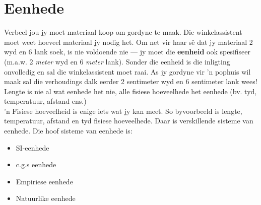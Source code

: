 \section{Eenhede}
Verbeel jou jy moet materiaal koop om gordyne te maak. Die winkelassistent moet weet hoeveel materiaal jy nodig het. Om net vir haar sê dat jy materiaal 2 wyd en 6 lank soek, is nie voldoende nie --- jy moet die \textbf{eenheid} ook spesifiseer (m.a.w. 2 \textsl{meter} wyd en 6 \textsl{meter} lank). Sonder die eenheid is die inligting onvolledig en sal die winkelassistent moet raai. As jy gordyne vir  'n pophuis wil maak sal die verhoudings dalk eerder 2 sentimeter wyd en 6 sentimeter lank wees!\\ 
Lengte is nie al wat eenhede het nie, alle fisiese hoeveelhede het eenhede (bv. tyd, temperatuur, afstand ens.)\\
 { 'n Fisiese hoeveelheid is enige iets wat jy kan meet. So byvoorbeeld is lengte, temperatuur, afstand en tyd fisiese hoeveelhede.} 
Daar is verskillende sisteme van eenhede. Die hoof sisteme van eenhede is: 
\begin{itemize}
 \item SI-eenhede
\item c.g.s eenhede
\item Empiriese eenhede
\item Natuurlike eenhede
\end{itemize}
